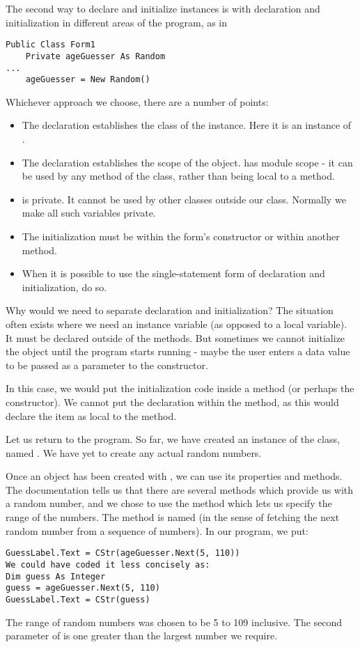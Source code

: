 		The second way to declare and initialize instances is with declaration and initialization in different areas of the program, as in
		\begin{lstlisting}
Public Class Form1
	Private ageGuesser As Random
...
	ageGuesser = New Random()
		\end{lstlisting}
		Whichever approach we choose, there are a number of points:
		\begin{itemize}
			\item The declaration establishes the class of the instance. Here it is an instance of .
			\item The declaration establishes the scope of the object.  has module scope - it can be used by any method of the  class, rather than being local to a method.
			\item {} is private. It cannot be used by other classes outside our  class. Normally we make all such variables private.
			\item The initialization must be within the form's constructor or within another method.
			\item When it is possible to use the single-statement form of declaration and initialization, do so.
		\end{itemize}
		Why would we need to separate declaration and initialization? The situation often exists where we need an instance variable (as opposed to a local variable). It must be declared outside of the methods. But sometimes we cannot initialize the object until the program starts running - maybe the user enters a data value to be passed as a parameter to the constructor.
		
		In this case, we would put the initialization code inside a method (or perhaps the constructor). We cannot put the declaration within the method, as this would declare the item as local to the method.
		
		Let us return to the  program. So far, we have created an instance of the  class, named . We have yet to create any actual random numbers.
		
		Once an object has been created with , we can use its properties and methods. The documentation tells us that there are several methods which provide us with a random number, and we chose to use the method which lets us specify the range of the numbers. The method is named  (in the sense of fetching the next random number from a sequence of numbers). In our program, we put:
		\begin{lstlisting}
GuessLabel.Text = CStr(ageGuesser.Next(5, 110))
We could have coded it less concisely as:
Dim guess As Integer
guess = ageGuesser.Next(5, 110)
GuessLabel.Text = CStr(guess)
		\end{lstlisting}
		The range of random numbers was chosen to be 5 to 109 inclusive. The second parameter of  is one greater than the largest number we require.

